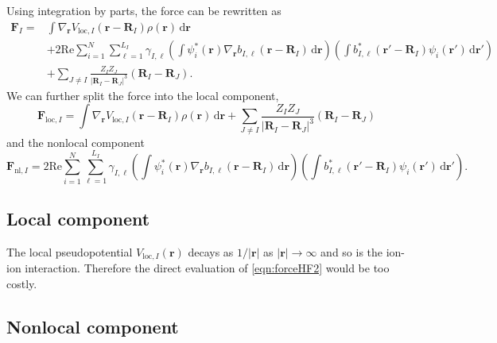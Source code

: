 \documentclass{article}
\newcommand{\bvec}[1]{\mathbf{#1}}
\newcommand{\vr}{\bvec{r}}
\newcommand{\vF}{\bvec{F}}
\newcommand{\vR}{\bvec{R}}
\renewcommand{\Re}{\mathrm{Re}}
\newcommand{\abs}[1]{\left\lvert#1\right\rvert}
\newcommand{\ud}{\,\mathrm{d}}
\theoremstyle{plain}
\theoremstyle{remark}
\theoremstyle{plain}
\theoremstyle{plain}
\theoremstyle{plain}
\begin{document}
Using integration by parts, the force can be rewritten as
\begin{equation}
  \begin{split}
    \vF_{I} = &\int \nabla_{\vr} V_{\text{loc},I}(\vr-\vR_{I})
    \rho(\vr) \ud \vr\\
    & + 2 \Re \sum_{i=1}^{N} \sum_{\ell=1}^{L_{I}} \gamma_{I,\ell}
    \left(\int \psi^{*}_{i}(\vr) \nabla_{\vr} b_{I,\ell}(\vr-\vR_{I}) \ud \vr \right)
    \left(\int b^{*}_{I,\ell}(\vr'-\vR_{I}) \psi_{i}(\vr') \ud \vr' \right)\\
    & + \sum_{J\ne I}\frac{Z_{I}Z_{J}}{\abs{\vR_{I}-\vR_{J}}^3}(\vR_{I}-\vR_{J}).
  \end{split}
  \label{eqn:forceHF2}
\end{equation}
We can further split the force into the local component,
\begin{equation}
 \vF_{\text{loc},I}=\int \nabla_{\vr} V_{\text{loc},I}(\vr-\vR_{I})
    \rho(\vr) \ud \vr+ \sum_{J\ne I}\frac{Z_{I}Z_{J}}{\abs{\vR_{I}-\vR_{J}}^3}(\vR_{I}-\vR_{J})
\label{eqn:force_loc}
\end{equation}
and the nonlocal component
\begin{equation}
 \vF_{\text{nl},I}= 2 \Re \sum_{i=1}^{N} \sum_{\ell=1}^{L_{I}} \gamma_{I,\ell}
    \left(\int \psi^{*}_{i}(\vr) \nabla_{\vr} b_{I,\ell}(\vr-\vR_{I}) \ud \vr \right)
    \left(\int b^{*}_{I,\ell}(\vr'-\vR_{I}) \psi_{i}(\vr') \ud \vr' \right).
\label{eqn:force_nl}
\end{equation}

\subsection{Local component}

The local pseudopotential $V_{\text{loc},I}(\vr)$ decays as $1/|\vr|$ as $|\vr|\to \infty$ and so is the ion-ion interaction. Therefore the direct evaluation of \cref{eqn:forceHF2} would be too costly. 

\subsection{Nonlocal component}
\end{document}
